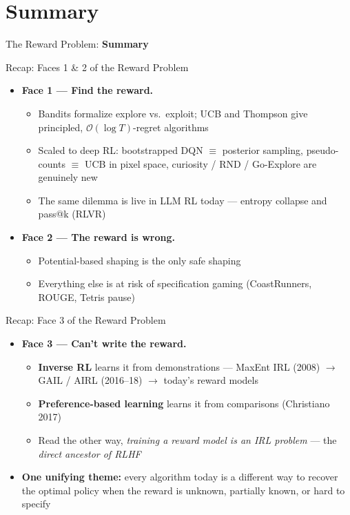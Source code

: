 \section{Summary}
\begin{frame}{}
    \LARGE The Reward Problem: \textbf{Summary}
\end{frame}

\begin{frame}{Recap: Faces 1 \& 2 of the Reward Problem}
\begin{itemize}
    \setlength{\itemsep}{0.7em}
    \item \textbf{Face 1 --- Find the reward.}
    \begin{itemize}
        \item Bandits formalize explore vs.\ exploit; UCB and Thompson give principled, $\mathcal{O}(\log T)$-regret algorithms
        \item Scaled to deep RL: bootstrapped DQN $\equiv$ posterior sampling, pseudo-counts $\equiv$ UCB in pixel space, curiosity / RND / Go-Explore are genuinely new
        \item The same dilemma is live in LLM RL today --- entropy collapse and pass@k (RLVR)
    \end{itemize}
    \item \textbf{Face 2 --- The reward is wrong.}
    \begin{itemize}
        \item Potential-based shaping is the only safe shaping
        \item Everything else is at risk of specification gaming (CoastRunners, ROUGE, Tetris pause)
    \end{itemize}
\end{itemize}
\end{frame}

\begin{frame}{Recap: Face 3 of the Reward Problem}
\begin{itemize}
    \setlength{\itemsep}{0.7em}
    \item \textbf{Face 3 --- Can't write the reward.}
    \begin{itemize}
        \item \textbf{Inverse RL} learns it from demonstrations --- MaxEnt IRL (2008) $\to$ GAIL / AIRL (2016--18) $\to$ today's reward models
        \item \textbf{Preference-based learning} learns it from comparisons (Christiano 2017)
        \item Read the other way, \emph{training a reward model is an IRL problem} --- the \emph{direct ancestor of RLHF}
    \end{itemize}
    \item \textbf{One unifying theme:} every algorithm today is a different way to recover the optimal policy when the reward is unknown, partially known, or hard to specify
\end{itemize}
\end{frame}

